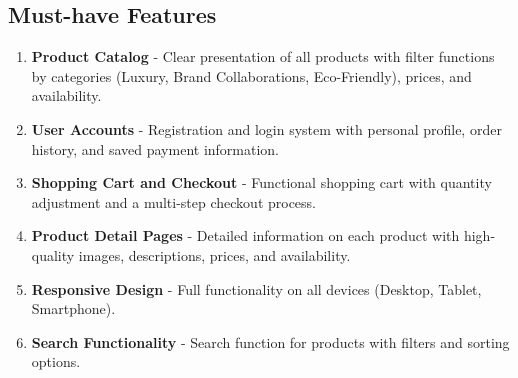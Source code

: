 \documentclass[a4paper,11pt]{article}
\begin{document}
\subsection{Must-have Features}
\begin{enumerate}[label=\textbf{MF\arabic*:}]
    \item \textbf{Product Catalog} - Clear presentation of all products with filter functions by categories (Luxury, Brand Collaborations, Eco-Friendly), prices, and availability.
    \item \textbf{User Accounts} - Registration and login system with personal profile, order history, and saved payment information.
    \item \textbf{Shopping Cart and Checkout} - Functional shopping cart with quantity adjustment and a multi-step checkout process.
    \item \textbf{Product Detail Pages} - Detailed information on each product with high-quality images, descriptions, prices, and availability.
    \item \textbf{Responsive Design} - Full functionality on all devices (Desktop, Tablet, Smartphone).
    \item \textbf{Search Functionality} - Search function for products with filters and sorting options.
    
\end{enumerate}
\end{document}
